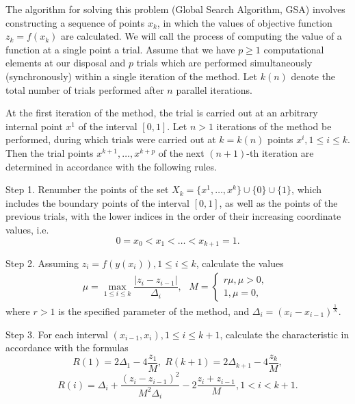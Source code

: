 \documentclass{svproc}
\begin{document}
The algorithm for solving this problem (Global Search Algorithm, GSA) involves constructing a sequence of points \(x_k\), in which the values of objective function \(z_k = f(x_k)\) are calculated. We will call the process of computing the value of a function at a single point a trial. Assume that we have \(p\geqslant 1\) computational elements at our disposal and \(p\) trials which are performed simultaneously (synchronously) within a single iteration of the method. Let \(k(n)\) denote the total number of trials performed after \(n\) parallel iterations.

At the first iteration of the method, the trial is carried out at an arbitrary internal point \(x^1\) of the interval \([0,1]\). Let \(n>1\) iterations of the method be performed, during which trials were carried out at \(k = k(n)\) points \(x^i, 1\leqslant i\leqslant k\). Then the trial points  \(x^{k+1},\dotsc,x^{k+p}\) of the next \((n+1)\)-th iteration are determined in accordance with the following rules.

Step 1. Renumber the points of the set \(X_k=\{x^1,\dotsc,x^k\}\cup\{0\}\cup\{1\}\), which includes the boundary points of the interval \([0,1]\), as well as the points of the previous trials, with the lower indices in the order of their increasing coordinate values, i.e.
\begin{displaymath}
0=x_0<x_1<\dotsc<x_{k+1}=1.
\end{displaymath}

Step 2. Assuming \(z_i=f(y(x_i)),1\leqslant i\leqslant k\), calculate the values
\begin{displaymath}
\label{step2}
\mu=\max_{1\leqslant i\leqslant k}\dfrac{|z_i-z_{i-1}|}{\Delta_i}, \;
\begin{matrix}
    M = 
    \left\{
    \begin{matrix}
    r\mu,\mu>0, \\
    1,\mu=0,
    \end{matrix} \right.
    \end{matrix}
\end{displaymath}
where \(r > 1\) is the specified parameter of the method, and \(\Delta_i=(x_i-x_{i-1})^\frac{1}{N}\). 

Step 3. For each interval \((x_{i-1},x_i),1\leqslant i\leqslant k+1\), calculate the characteristic in accordance with the formulas 
\begin{displaymath}
\label{step3_1}
R(1)=2\Delta_1-4\dfrac{z_1}{M}, \; R(k+1)=2\Delta_{k+1}-4\dfrac{z_k}{M},
\end{displaymath}
\begin{displaymath}
\label{step3_2}
R(i)=\Delta_i+\dfrac{(z_i-z_{i-1})^2}{M^2\Delta_i}-2\dfrac{z_i+z_{i-1}}{M},1<i<k+1.
\end{displaymath}
\end{document}
